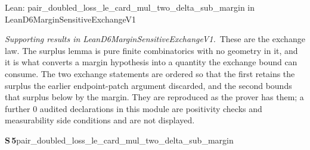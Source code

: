 \documentclass[conference]{IEEEtran}
\theoremstyle{definition}
\newcommand{\lean}[1]{\textsf{\footnotesize #1}}
\newcommand{\leanbox}[1]{%
  \par\vspace{2pt}\noindent
  {\footnotesize\textsf{Lean: #1}}\par\vspace{2pt}}
\begin{document}
\leanbox{\lean{pair\_doubled\_loss\_le\_card\_mul\_two\_delta\_sub\_margin} in
\lean{LeanD6MarginSensitiveExchangeV1}}

\noindent\emph{Supporting results in \lean{LeanD6MarginSensitiveExchangeV1}.}~These are the exchange law. The surplus lemma is pure finite combinatorics with no geometry in it, and it is what converts a margin hypothesis into a quantity the exchange bound can consume. The two exchange statements are ordered so that the first retains the surplus the earlier endpoint-patch argument discarded, and the second bounds that surplus below by the margin. They are reproduced as the prover has them; a further $0$ audited declarations in this module are positivity checks and measurability side conditions and are not displayed.

\noindent\textbf{S\,5}\quad\lean{pair\_doubled\_loss\_le\_card\_mul\_two\_delta\_sub\_margin}
\end{document}
